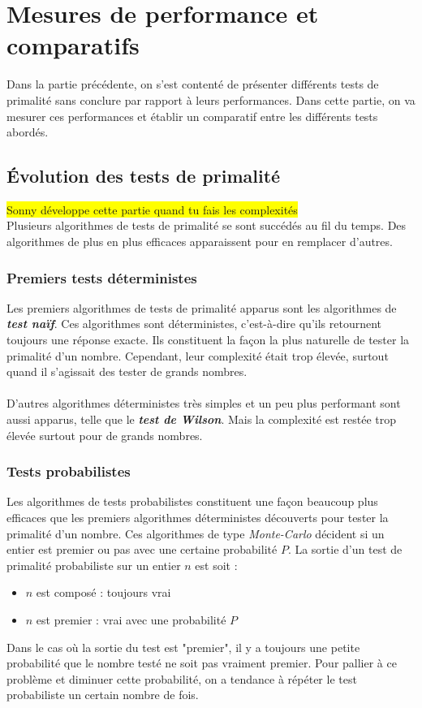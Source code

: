 \section{Mesures de performance et comparatifs}
	Dans la partie précédente, on s'est contenté de présenter différents tests de primalité sans conclure par rapport à leurs performances. Dans cette partie, on va mesurer ces performances et établir un comparatif entre les différents tests abordés.
	
	\subsection{Évolution des tests de primalité}
		\colorbox{yellow}{Sonny développe cette partie quand tu fais les complexités}\\
		Plusieurs algorithmes de tests de primalité se sont succédés au fil du temps. Des algorithmes de plus en plus efficaces apparaissent pour en remplacer d'autres.
	
		\subsubsection*{Premiers tests déterministes}
			Les premiers algorithmes de tests de primalité apparus sont les algorithmes de \textit{\textbf{test naïf}}. Ces algorithmes sont déterministes, c'est-à-dire qu'ils retournent toujours une réponse exacte. Ils constituent la façon la plus naturelle de tester la primalité d'un nombre. Cependant, leur complexité était trop élevée, surtout quand il s'agissait des tester de grands nombres.
			
			\paragraph{} D'autres algorithmes déterministes très simples et un peu plus performant sont aussi apparus, telle que le \textit{\textbf{test de Wilson}}. Mais la complexité est restée trop élevée surtout pour de grands nombres.
		
		\subsubsection*{Tests probabilistes}
			Les algorithmes de tests probabilistes constituent une façon beaucoup plus efficaces que les premiers algorithmes déterministes découverts pour tester la primalité d'un nombre. Ces algorithmes de type \textit{Monte-Carlo} décident si un entier est premier ou pas avec une certaine probabilité $P$. La sortie d'un test de primalité probabiliste sur un entier $n$ est soit :
			\begin{itemize}
				\item $n$ est composé : toujours vrai
				\item $n$ est premier : vrai avec une probabilité $P$
			\end{itemize}
			Dans le cas où la sortie du test est "premier", il y a toujours une petite probabilité que le nombre testé ne soit pas vraiment premier. Pour pallier à ce problème et diminuer cette probabilité, on a tendance à répéter le test probabiliste un certain nombre de fois.
			
